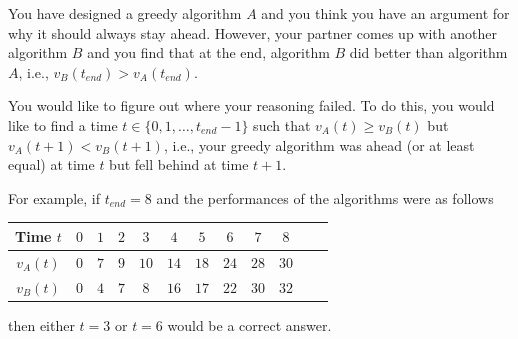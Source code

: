 \documentclass[12pt]{article}
\begin{document}
You have designed a greedy algorithm $A$ and you think you have an argument for why it should always stay ahead. However, your partner comes up with another algorithm $B$ and you find that at the end, algorithm $B$ did better than algorithm $A$, i.e., $v_{B}(t_{end}) > v_{A}(t_{end})$. 

You would like to figure out where your reasoning failed. To do this, you would like to find a time $t \in \{0,1,\ldots,t_{end}-1\}$ such that $v_{A}(t) \geq v_{B}(t)$ but $v_{A}(t+1) < v_{B}(t+1)$, i.e., your greedy algorithm was ahead (or at least equal) at time $t$ but fell behind at time $t+1$.

For example, if $t_{end} = 8$ and the performances of the algorithms were as follows
\begin{center}
\begin{tabular}{|c|c|c|c|c|c|c|c|c|c|c|c|}
 \hline
 Time $t$ & $0$ & $1$ & $2$ & $3$ & $4$ & $5$ & $6$ & $7$ & $8$\\
 \hline
 $v_A(t)$ & $0$ & $7$ & $9$ & $10$ & $14$ & $18$ & $24$ & $28$ & $30$\\
 \hline
 $v_B(t)$ & $0$ & $4$ & $7$ & $8$ & $16$ & $17$ & $22$ & $30$ & $32$\\
 \hline
\end{tabular}
\end{center}
then either $t = 3$ or $t = 6$ would be a correct answer.
\end{document}

